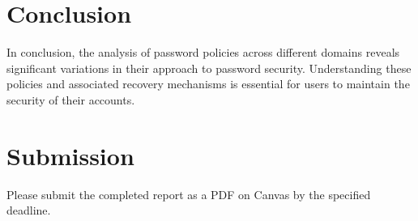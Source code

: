 \documentclass{article}
\begin{document}
\section{Conclusion}
In conclusion, the analysis of password policies across different domains reveals significant variations in their approach to password security. Understanding these policies and associated recovery mechanisms is essential for users to maintain the security of their accounts.

\section{Submission}
Please submit the completed report as a PDF on Canvas by the specified deadline.
\end{document}
